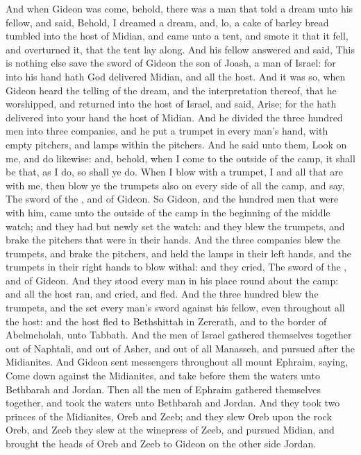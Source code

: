 \begin{biblechapter}
\verse And when Gideon was come, behold, there was a man that told a dream unto his fellow, and said, Behold, I dreamed a dream, and, lo, a cake of barley bread tumbled into the host of Midian, and came unto a tent, and smote it that it fell, and overturned it, that the tent lay along.
\verse And his fellow answered and said, This is nothing else save the sword of Gideon the son of Joash, a man of Israel: for into his hand hath God delivered Midian, and all the host.
\verse And it was so, when Gideon heard the telling of the dream, and the interpretation thereof, that he worshipped, and returned into the host of Israel, and said, Arise; for the \LORD hath delivered into your hand the host of Midian.
\verse And he divided the three hundred men into three companies, and he put a trumpet in every man's hand, with empty pitchers, and lamps within the pitchers.
\verse And he said unto them, Look on me, and do likewise: and, behold, when I come to the outside of the camp, it shall be that, as I do, so shall ye do.
\verse When I blow with a trumpet, I and all that are with me, then blow ye the trumpets also on every side of all the camp, and say, The sword of the \LORD, and of Gideon.
\verse So Gideon, and the hundred men that were with him, came unto the outside of the camp in the beginning of the middle watch; and they had but newly set the watch: and they blew the trumpets, and brake the pitchers that were in their hands.
\verse And the three companies blew the trumpets, and brake the pitchers, and held the lamps in their left hands, and the trumpets in their right hands to blow withal: and they cried, The sword of the \LORD, and of Gideon.
\verse And they stood every man in his place round about the camp: and all the host ran, and cried, and fled.
\verse And the three hundred blew the trumpets, and the \LORD set every man's sword against his fellow, even throughout all the host: and the host fled to Bethshittah in Zererath, and to the border of Abelmeholah, unto Tabbath.
\verse And the men of Israel gathered themselves together out of Naphtali, and out of Asher, and out of all Manasseh, and pursued after the Midianites.
\verse And Gideon sent messengers throughout all mount Ephraim, saying, Come down against the Midianites, and take before them the waters unto Bethbarah and Jordan. Then all the men of Ephraim gathered themselves together, and took the waters unto Bethbarah and Jordan.
\verse And they took two princes of the Midianites, Oreb and Zeeb; and they slew Oreb upon the rock Oreb, and Zeeb they slew at the winepress of Zeeb, and pursued Midian, and brought the heads of Oreb and Zeeb to Gideon on the other side Jordan.
\end{biblechapter}

